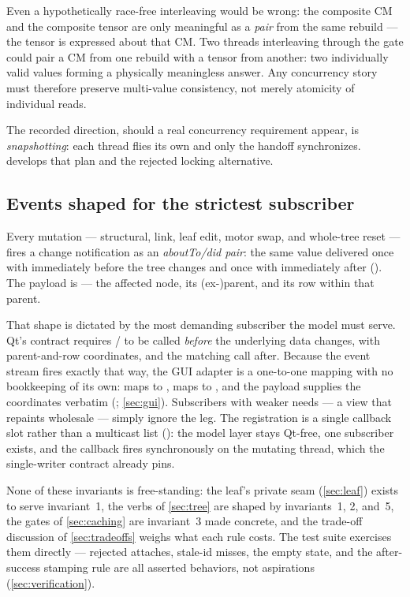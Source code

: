 \begin{keyinsight}
Even a hypothetically race-free interleaving would be wrong: the composite CM and the
composite tensor are only meaningful as a \emph{pair} from the same rebuild --- the tensor is
expressed about that CM. Two threads interleaving through the gate could pair a CM from one
rebuild with a tensor from another: two individually valid values forming a physically
meaningless answer. Any concurrency story must therefore preserve multi-value consistency,
not merely atomicity of individual reads.
\end{keyinsight}

The recorded direction, should a real concurrency requirement appear, is
\emph{snapshotting}: each thread flies its own  and only the handoff
synchronizes.  develops that plan and the rejected locking
alternative.

\subsection{Events shaped for the strictest subscriber}\label{sec:philosophy-events}

Every mutation --- structural, link, leaf edit, motor swap, and whole-tree reset --- fires a
change notification as an \emph{aboutTo/did pair}: the same  value delivered
once with  immediately before the tree changes and once with
 immediately after (). The payload
is  --- the affected node, its (ex-)parent, and its row
within that parent.

That shape is dictated by the most demanding subscriber the model must serve. Qt's
 contract requires /
to be called \emph{before} the underlying data changes, with parent-and-row coordinates, and
the matching  call after. Because the event stream fires exactly that way, the GUI
adapter is a one-to-one mapping with no bookkeeping of its own:  maps to
,  maps to , and the payload supplies the coordinates
verbatim (; \cref{sec:gui}). Subscribers with weaker needs
--- a view that repaints wholesale --- simply ignore the  leg. The registration
is a single callback slot rather than a multicast list
(): the model layer stays Qt-free, one subscriber exists,
and the callback fires synchronously on the mutating thread, which the single-writer
contract already pins.

\medskip

None of these invariants is free-standing: the leaf's private seam (\cref{sec:leaf}) exists
to serve invariant~1, the verbs of \cref{sec:tree} are shaped by invariants~1, 2, and~5, the
gates of \cref{sec:caching} are invariant~3 made concrete, and the trade-off discussion of
\cref{sec:tradeoffs} weighs what each rule costs. The test suite exercises them directly ---
rejected attaches, stale-id misses, the empty state, and the after-success stamping rule are
all asserted behaviors, not aspirations (\cref{sec:verification}).
